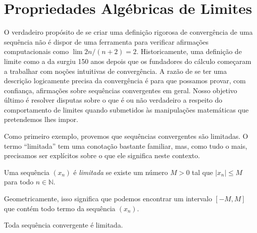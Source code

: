 
 
\section{Propriedades Algébricas de Limites}\label{sec2:teoremas-limite-algebrico-ordem}

O verdadeiro propósito de se criar uma definição rigorosa de convergência de uma sequência não é dispor de uma ferramenta para verificar afirmações computacionais como $\lim 2n/(n+2) = 2$. Historicamente, uma definição de limite como a da  surgiu 150 anos depois que os fundadores do cálculo começaram a trabalhar com noções intuitivas de convergência. A razão de se ter uma descrição logicamente precisa da convergência é para que possamos provar, com confiança, afirmações sobre sequências convergentes em geral. Nosso objetivo último é resolver disputas sobre o que é ou não verdadeiro a respeito do comportamento de limites quando submetidos às manipulações matemáticas que pretendemos lhes impor.

Como primeiro exemplo, provemos que sequências convergentes são limitadas. O termo ``limitada'' tem uma conotação bastante familiar, mas, como tudo o mais, precisamos ser explícitos sobre o que ele significa neste contexto.

\begin{definition}\label{def:sequencia-limitada}
Uma sequência $(x_n)$ é \textit{limitada} se existe um número $M > 0$ tal que $|x_n| \leq M$ para todo $n \in \mathbb{N}$. 
\end{definition}

Geometricamente, isso significa que podemos encontrar um intervalo $[-M, M]$ que contém todo termo da sequência $(x_n)$.

\begin{theorem}\label{thm:convergente-limitada}
Toda sequência convergente é limitada. 
\end{theorem}

